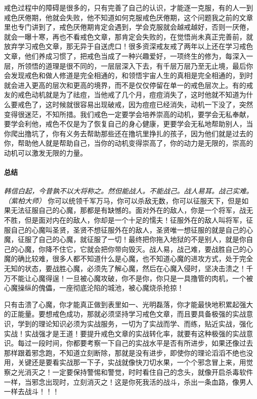 戒色过程中的障碍是很多的，只有完善了自己的认识，才能逐一克服，有的人一到戒色厌倦期，他就会失败，他不知道如何克服戒色厌倦期，这个问题我之前的文章里也专门讲到了，戒色厌倦期肯定会遇到，学会克服就会越戒越好，否则一厌倦，就会一曝十寒，再也不看戒色文章，那肯定会失败的，在觉悟尚未真正完善前，就放弃学习戒色文章，那无异于自送虎口！很多资深戒友戒了两年以上还在学习戒色文章，他们养成习惯了，把戒色当成了一种兴趣爱好，一项终生的修为，每深入一层，所领悟的道理是很不同的，一层层深入下去，有千层万层乃至无止境，最后你会发现戒色和做人修道是完全相通的，和领悟宇宙人生的真相是完全相通的，到时就会进入更高的层次和更高的境界，而不是仅仅停留在单一的戒色层次上。有的戒友的戒色动机就是为了祛痘，当他戒了几个月，痘痘消失了，这时他就不知道为什么要戒色了，这时候就很容易出现破戒，因为痘痘已经消失，动机一下没了，突然变得很迷茫，不知所措。我们戒色一定要学会培养崇高的动机，要学会无私奉献，要学会利他，戒色不仅是为了恢复自己的身心健康，更要学会无私地帮助别人，当你爬出撸坑了，你有义务去帮助那些还在撸坑里挣扎的孩子，因为他们就是过去的你，帮助他人就是帮助自己，当你的动机变得崇高了，你的动力是无限的，崇高的动机可以激发无限的力量。

\paragraph*{总结}

\textit{韩信白起，今昔孰不以大将称之。然但能战人。不能战己。战人易耳。战己实难。（紫柏大师）} 你可以统领千军万马，你可以杀敌无数，你可以征服天下，但是如果无法征服自己的心魔，那都是有缺憾的。面对外在的敌人，你是一个将军，战无不胜，但是面对内在的敌人，你却是一个十足的懦夫！征服外在的敌人叫将军，征服自己的心魔叫圣贤，圣贤不想征服外在的敌人，圣贤唯一想征服的就是自己的心魔，征服了自己的心魔，就征服了一切！最终把你拖入地狱的不是别人，就是你自己的心魔，你降不住它，它就会把你带向毁灭。战人易，战己难，要战胜自己的心魔的确比较难，很多人都不知道什么是心魔，也不知道心魔的进攻方式，处于完全无知的状态，要战胜心魔，必须先了解心魔，然后在心魔入侵时，坚决击溃之！千万不能让心魔得逞！一旦被心魔攻破，你不是你，你只是一具撸管的肉机，一个被心魔操纵的傀儡，一座彻底沦陷的城池，被心魔烧杀抢掠！

只有击溃了心魔，你才能真正做到表里如一、光明磊落，你才能最快地积累起强大的正能量。要想戒色成功，那就必须坚持学习戒色文章，而且要具备极强的实战意识，学到的理论知识必须为实战服务，一切为了实战而学、而练，贴近实战，强化实战！实战强才是王道！要提升戒色文章的实战转化率，就要有这种极强的实战意识。每过一段时间，你都要考察一下自己的实战水平是否有所进步，如果还像过去那样跟着邪念跑，不知道立刻断除，那就是没有进步，即使你的理论滔滔不绝也没用，关键还是要看实战那一下子，实战就像快刀切水果，一个个邪念冒上来，用觉察之光消灭之！一定要保持警惕和警觉，时时看住自己的念头，就像开启杀毒软件一样，当邪念出现时，立刻消灭之！这是你死我活的战斗，杀出一条血路，像男人一样去战斗！！！

